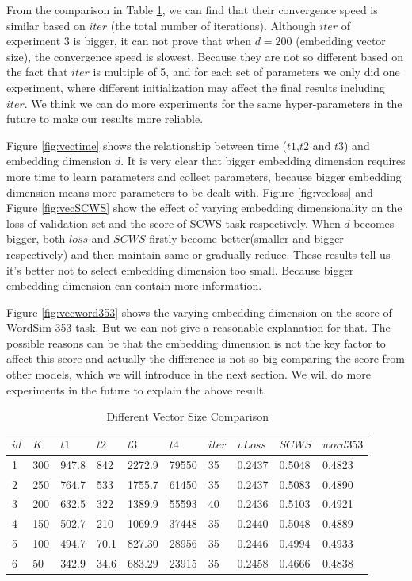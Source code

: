 From the comparison in Table \ref{tab:group1}, we can find that their convergence speed is similar based on $iter$ (the total number of iterations). Although $iter$ of experiment 3 is bigger, it can not prove that when $d=200$ (embedding vector size), the convergence speed is slowest. Because they are not so different based on the fact that $iter$ is multiple of 5, and for each set of parameters we only did one experiment, where different initialization may affect the final results including $iter$. We think we can do more experiments for the same hyper-parameters in the future to make our results more reliable. 

Figure \ref{fig:vectime} shows the relationship between time ($t1$,$t2$ and $t3$) and embedding dimension $d$. It is very clear that bigger embedding dimension requires more time to learn parameters and collect parameters, because bigger embedding dimension means more parameters to be dealt with.  Figure \ref{fig:vecloss} and Figure \ref{fig:vecSCWS} show the effect of varying embedding dimensionality on the loss of validation set and the score of SCWS task respectively. When $d$ becomes bigger, both $loss$ and $SCWS$ firstly become better(smaller and bigger respectively) and then maintain same or gradually reduce. These results tell us it's better not to select embedding dimension too small. Because bigger embedding  dimension can contain more information.

Figure \ref{fig:vecword353} shows the varying embedding dimension on the score of WordSim-353 task. But we can not give a reasonable explanation for that. The possible reasons can be that the embedding dimension is not the key factor to affect this score and actually the difference is not so big comparing the score from other models, which we will introduce in the next section. We will do more experiments in the future to explain the above result.

\begin{table}[tb]
\caption{Different Vector Size Comparison} \label{tab:group1} 
\begin{center}
\begin{tabular}{|l|l|l|l|l|l|l|l|l|l|}
\hline
$id$ & $K$  & $t1$ & $t2$  & $t3$ & $t4$ & $iter$ &   $vLoss$  & 	$SCWS$ & 	$word353$	  \\ 
\hline
1 	& 300 	& 947.8	& 842	& 2272.9 &	79550  & 35	& 0.2437 &0.5048 & 0.4823  \\ 
\hline
2 	& 250 	& 764.7& 533& 1755.7 &	61450  	& 35	 & 0.2437 &0.5083 & 0.4890 \\ 
\hline
3 	& 200 	& 632.5& 322	& 1389.9 &  55593  & 40	 & 0.2436 &0.5103 & 0.4921 \\ 
\hline
4 	& 150 	& 502.7& 210& 1069.9 &	37448  	& 35	 & 0.2440 &0.5048 & 0.4889 \\ 
\hline
5 	& 100 	& 494.7	& 70.1	& 827.30 &	28956  & 35	 & 0.2446 &0.4994 & 0.4933  \\ 
\hline
6 	& 50 	& 342.9& 34.6		& 683.29 &	23915 & 35 & 0.2458 &0.4666 & 0.4838  \\ 
\hline
\end{tabular}
\end{center}
\end{table}



